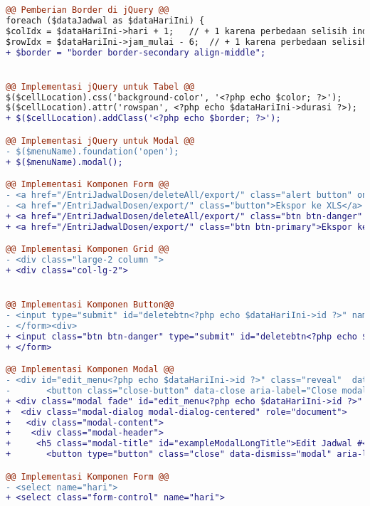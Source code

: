 \begin{lstlisting}[language=diff, caption=Kode untuk Halaman Entri Jadwal Dosen, label=Entri, basicstyle=\ttfamily, frame=single,
columns=fullflexible, keepspaces=true, breaklines=true]
@@ Pemberian Border di jQuery @@
foreach ($dataJadwal as $dataHariIni) {
$colIdx = $dataHariIni->hari + 1;   // + 1 karena perbedaan selisih index tabel dan value hari di database 
$rowIdx = $dataHariIni->jam_mulai - 6;  // + 1 karena perbedaan selisih index tabel dan value jam_mulai di database 
+ $border = "border border-secondary align-middle";


@@ Implementasi jQuery untuk Tabel @@
$($cellLocation).css('background-color', '<?php echo $color; ?>');
$($cellLocation).attr('rowspan', <?php echo $dataHariIni->durasi ?>);
+ $($cellLocation).addClass('<?php echo $border; ?>');

@@ Implementasi jQuery untuk Modal @@
- $($menuName).foundation('open');
+ $($menuName).modal();

@@ Implementasi Komponen Form @@
- <a href="/EntriJadwalDosen/deleteAll/export/" class="alert button" onClick="return konfirmasi();">Delete All</a>
- <a href="/EntriJadwalDosen/export/" class="button">Ekspor ke XLS</a>
+ <a href="/EntriJadwalDosen/deleteAll/export/" class="btn btn-danger" onClick="return konfirmasi();">Delete All</a>
+ <a href="/EntriJadwalDosen/export/" class="btn btn-primary">Ekspor ke XLS</a>

@@ Implementasi Komponen Grid @@
- <div class="large-2 column ">
+ <div class="col-lg-2">


@@ Implementasi Komponen Button@@
- <input type="submit" id="deletebtn<?php echo $dataHariIni->id ?>" name="deletebtn<?php echo $dataHariIni->id ?>" class="alert button" value="Delete">
- </form><div>
+ <input class="btn btn-danger" type="submit" id="deletebtn<?php echo $dataHariIni->id ?>" name="deletebtn<?php echo $dataHariIni->id ?>" value="Delete">
+ </form>

@@ Implementasi Komponen Modal @@
- <div id="edit_menu<?php echo $dataHariIni->id ?>" class="reveal"  data-reveal >
- 		<button class="close-button" data-close aria-label="Close modal" type="button">
+ <div class="modal fade" id="edit_menu<?php echo $dataHariIni->id ?>" tabindex="-1" role="dialog" aria-hidden="true">
+  <div class="modal-dialog modal-dialog-centered" role="document">
+   <div class="modal-content">
+    <div class="modal-header">
+     <h5 class="modal-title" id="exampleModalLongTitle">Edit Jadwal #<?= $dataHariIni->id ?></h5>
+ 		<button type="button" class="close" data-dismiss="modal" aria-label="Close">

@@ Implementasi Komponen Form @@
- <select name="hari"> 
+ <select class="form-control" name="hari">


\end{lstlisting}
